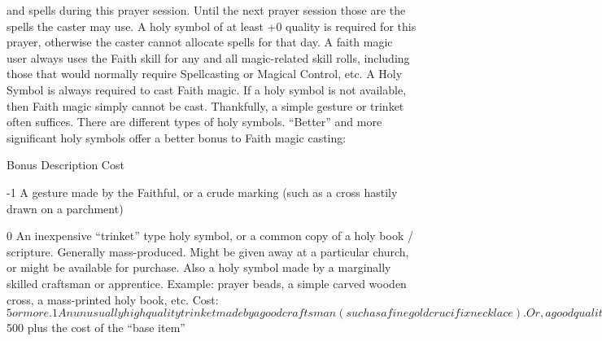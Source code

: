 \documentclass[twoside]{book}
\begin{document}
               and spells during this prayer session. Until the next
               prayer session those are the spells the caster may use. A
               holy symbol of at least +0 quality is required for this
               prayer, otherwise the caster cannot allocate spells for
               that day.   A faith magic user always uses the Faith skill for
               any and all magic-related skill rolls, including those
               that would normally require Spellcasting or Magical
               Control, etc.   A Holy Symbol is always required to cast Faith
               magic. If a holy symbol is not available, then Faith magic
               simply cannot be cast. Thankfully, a simple gesture or
               trinket often suffices. There are different types of holy
               symbols. “Better” and more significant holy
               symbols offer a better bonus to Faith magic casting:
                 
                
                  
                   Bonus   
                   Description   
                   Cost   
                  
                  
                   -1   
                     A gesture made by the Faithful, or a crude
                     marking (such as a cross hastily drawn on a
                     parchment) 
                  
                  
                   0   
                     An inexpensive “trinket” type holy
                     symbol, or a common copy of a holy book / scripture.
                     Generally mass-produced. Might be given away at a
                     particular church, or might be available for
                     purchase. Also a holy symbol made by a marginally
                     skilled craftsman or apprentice. Example: prayer
                     beads, a simple carved wooden cross, a mass-printed
                     holy book, etc. Cost: $5 or more. 
                  
                  
                   1   
                     An unusually high quality trinket made by a
                     good craftsman (such as a fine gold crucifix
                     necklace). Or, a good quality weapon bearing
                     religious inscription and symbols. Or, an item from
                     a particular church which is not available to the
                     general public (such as the robes of an ordained
                     priest), or a fine quality holy book. 
                     Cost: At least $500 plus the cost of the
                     “base item” 
                  
\end{document}
